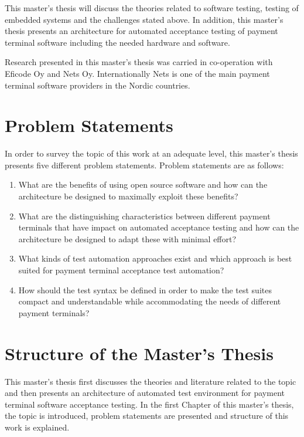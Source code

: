This master's thesis will discuss the theories related to software testing, testing of embedded systems and the challenges stated above. In addition, this master's thesis presents an architecture for automated acceptance testing of payment terminal software including the needed hardware and software.

Research presented in this master’s thesis was carried in co-operation with Eficode Oy and Nets Oy. Internationally Nets is one of the main payment terminal software providers in the Nordic countries.

\section{Problem Statements}

In order to survey the topic of this work at an adequate level, this master's thesis presents five different problem statements. Problem statements are as follows:
\begin{enumerate}
\item What are the benefits of using open source software and how can the architecture be designed to maximally exploit these benefits?
\item What are the distinguishing characteristics between different payment terminals that have impact on automated acceptance testing and how can the architecture be designed to adapt these with minimal effort?
\item What kinds of test automation approaches exist and which approach is best suited for payment terminal acceptance test automation?
\item How should the test syntax be defined in order to make the test suites compact and understandable while accommodating the needs of different payment terminals?
\end{enumerate}

\section{Structure of the Master's Thesis}
\label{section:structure} 

This master's thesis first discusses the theories and literature related to the topic and then presents an architecture of automated test environment for payment terminal software acceptance testing. In the first Chapter of this master's thesis, the topic is introduced, problem statements are presented and structure of this work is explained.

